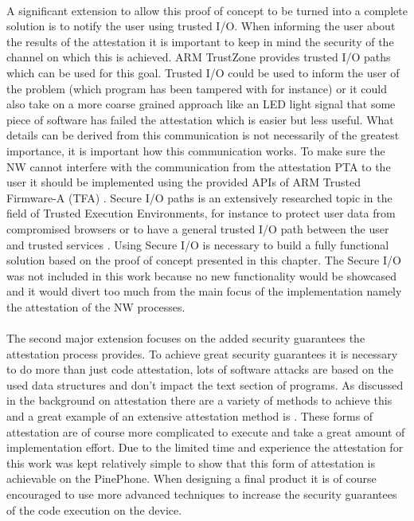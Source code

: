 \paragraph*{}%
A significant extension to allow this proof of concept to be turned into a complete solution is to notify the user using trusted I/O. When informing the user about the results of the attestation it is important to keep in mind the security of the channel on which this is achieved. ARM TrustZone provides trusted I/O paths which can be used for this goal. Trusted I/O could be used to inform the user of the problem (which program has been tampered with for instance) or it could also take on a more coarse grained approach like an LED light signal that some piece of software has failed the attestation which is easier but less useful. What details can be derived from this communication is not necessarily of the greatest importance, it is important how this communication works. To make sure the NW cannot interfere with the communication from the attestation PTA to the user it should be implemented using the provided APIs of ARM Trusted Firmware-A (TFA) \cite{ARMfirmware}. Secure I/O paths is an extensively researched topic in the field of Trusted Execution Environments, for instance to protect user data from compromised browsers \cite{EskandarianSaba2018FPUS} or to have a general trusted I/O path between the user and trusted services \cite{LiWenhao2014Btpo}. Using Secure I/O is necessary to build a fully functional solution based on the proof of concept presented in this chapter. The Secure I/O was not included in this work because no new functionality would be showcased and it would divert too much from the main focus of the implementation namely the attestation of the NW processes.

\paragraph*{}%
The second major extension focuses on the added security guarantees the attestation process provides. To achieve great security guarantees it is necessary to do more than just code attestation, lots of software attacks are based on the used data structures and don't impact the text section of programs. As discussed in the background on attestation there are a variety of methods to achieve this and a great example of an extensive attestation method is \cite{MuhlbergJanTobias2016LaFT}. These forms of attestation are of course more complicated to execute and take a great amount of implementation effort. Due to the limited time and experience the attestation for this work was kept relatively simple to show that this form of attestation is achievable on the PinePhone. When designing a final product it is of course encouraged to use more advanced techniques to increase the security guarantees of the code execution on the device.

